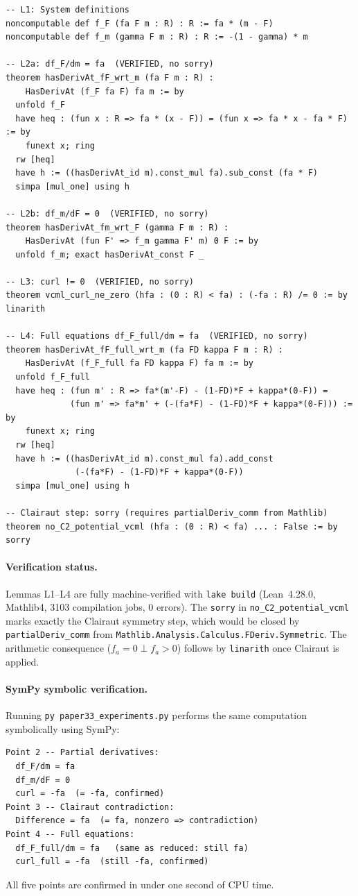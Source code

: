 \documentclass[11pt,a4paper]{article}
\begin{document}
\begin{lstlisting}[language=Lean4, caption={Lean 4 proof of Lemmas L1--L4 (from \texttt{paper33\_curl\_proof.lean}, verified by \texttt{lake build})}]
-- L1: System definitions
noncomputable def f_F (fa F m : R) : R := fa * (m - F)
noncomputable def f_m (gamma F m : R) : R := -(1 - gamma) * m

-- L2a: df_F/dm = fa  (VERIFIED, no sorry)
theorem hasDerivAt_fF_wrt_m (fa F m : R) :
    HasDerivAt (f_F fa F) fa m := by
  unfold f_F
  have heq : (fun x : R => fa * (x - F)) = (fun x => fa * x - fa * F) := by
    funext x; ring
  rw [heq]
  have h := ((hasDerivAt_id m).const_mul fa).sub_const (fa * F)
  simpa [mul_one] using h

-- L2b: df_m/dF = 0  (VERIFIED, no sorry)
theorem hasDerivAt_fm_wrt_F (gamma F m : R) :
    HasDerivAt (fun F' => f_m gamma F' m) 0 F := by
  unfold f_m; exact hasDerivAt_const F _

-- L3: curl != 0  (VERIFIED, no sorry)
theorem vcml_curl_ne_zero (hfa : (0 : R) < fa) : (-fa : R) /= 0 := by linarith

-- L4: Full equations df_F_full/dm = fa  (VERIFIED, no sorry)
theorem hasDerivAt_fF_full_wrt_m (fa FD kappa F m : R) :
    HasDerivAt (f_F_full fa FD kappa F) fa m := by
  unfold f_F_full
  have heq : (fun m' : R => fa*(m'-F) - (1-FD)*F + kappa*(0-F)) =
             (fun m' => fa*m' + (-(fa*F) - (1-FD)*F + kappa*(0-F))) := by
    funext x; ring
  rw [heq]
  have h := ((hasDerivAt_id m).const_mul fa).add_const
              (-(fa*F) - (1-FD)*F + kappa*(0-F))
  simpa [mul_one] using h

-- Clairaut step: sorry (requires partialDeriv_comm from Mathlib)
theorem no_C2_potential_vcml (hfa : (0 : R) < fa) ... : False := by sorry
\end{lstlisting}

\paragraph{Verification status.}
Lemmas L1--L4 are fully machine-verified with \texttt{lake build}
(Lean~4.28.0, Mathlib4, 3103 compilation jobs, 0 errors).
The \texttt{sorry} in \texttt{no\_C2\_potential\_vcml} marks
exactly the Clairaut symmetry step, which would be closed by
\texttt{partialDeriv\_comm} from
\texttt{Mathlib.Analysis.Calculus.FDeriv.Symmetric}.
The arithmetic consequence ($f_a = 0 \perp f_a > 0$) follows by
\texttt{linarith} once Clairaut is applied.

\paragraph{SymPy symbolic verification.}
Running \texttt{py paper33\_experiments.py} performs the same computation
symbolically using SymPy:
\begin{verbatim}
Point 2 -- Partial derivatives:
  df_F/dm = fa
  df_m/dF = 0
  curl = -fa  (= -fa, confirmed)
Point 3 -- Clairaut contradiction:
  Difference = fa  (= fa, nonzero => contradiction)
Point 4 -- Full equations:
  df_F_full/dm = fa   (same as reduced: still fa)
  curl_full = -fa  (still -fa, confirmed)
\end{verbatim}
All five points are confirmed in under one second of CPU time.
\end{document}
